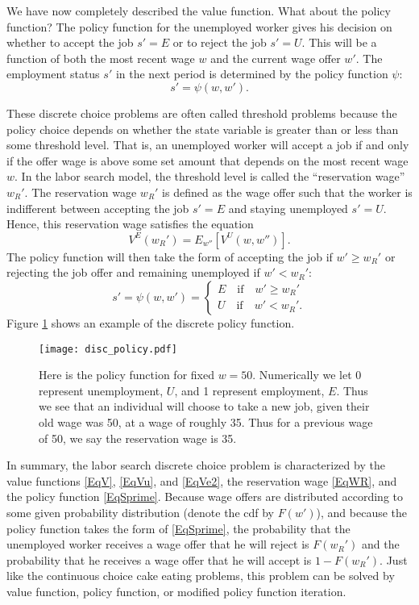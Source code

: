 We have now completely described the value function. What about the policy function?
The policy function for the unemployed worker gives his decision on whether to accept the job $s'=E$
or to reject the job $s'= U$.
This will be a function of both the most recent wage $w$ and the current wage offer $w'$.
The employment status $s'$ in the next period is determined by the policy function $\psi$:
\[
s' = \psi(w,w').
\]

These discrete choice problems are often called threshold
problems because the policy choice depends on whether the state variable is greater than or less than
some threshold level. That is, an unemployed worker will accept a job if and only if the offer wage is
above some set amount that depends on the most recent wage $w$. In the labor search model,
the threshold level is called the ``reservation wage'' $w_R'$. The reservation wage $w_R'$ is defined as
the wage offer such that the worker is indifferent between accepting the job $s' = E$ and
staying unemployed $s' = U$. Hence, this reservation wage satisfies the equation
\begin{equation}\label{EqWR}
   V^E(w_R') = E_{w''}\left[V^U(w,w'')\right].
\end{equation}
The policy function will then take the form of accepting the job if $w' \geq w_R'$ or
rejecting the job offer and remaining unemployed if $w' < w_R'$:
\begin{equation}\label{EqSprime}
   s' = \psi(w,w') = \begin{cases}
                      E \quad\text{if}\quad w' \geq w_R' \\
                      U \quad\text{if}\quad w' < w_R'.
                   \end{cases}
\end{equation}
Figure \ref{fig:disc_policy} shows an example of the discrete policy function.

\begin{figure}
\texttt{[image: disc\_policy.pdf]}
\caption{Here is the policy function for fixed $w = 50$.  Numerically we let 0 represent unemployment, $U$,
and 1 represent employment, $E$.  Thus we see that an individual will choose to take a new job, given
their old wage was 50, at a wage of roughly 35.  Thus for a previous wage of 50, we say the reservation wage is 35.}
\label{fig:disc_policy}
\end{figure}

In summary, the labor search discrete choice problem is characterized by the value functions \eqref{EqV}, \eqref{EqVu},
and \eqref{EqVe2}, the reservation wage \eqref{EqWR}, and the policy function \eqref{EqSprime}. Because wage offers
are distributed according to some given probability distribution (denote the cdf by $F(w')$),
and because the policy function takes the form of \eqref{EqSprime},
the probability that the unemployed worker receives a wage offer that he will reject is $F(w_R')$ and the probability
that he receives a wage offer that he will accept is $1 - F(w_R')$. Just like the continuous choice cake eating
problems, this problem can be solved by value function, policy function, or modified policy function iteration.

